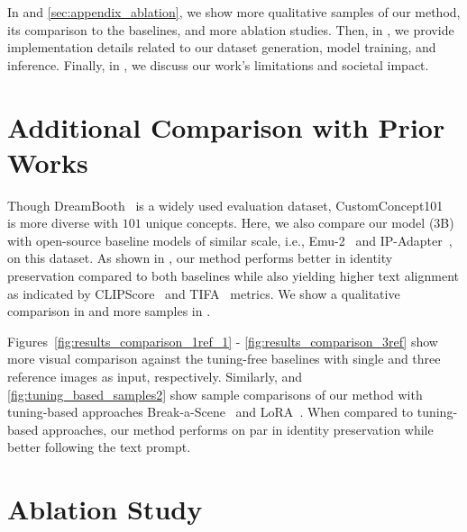 \renewcommand{\thefootnote}{\arabic{footnote}}
\clearpage
{}
\vspace{5pt}


In  and \ref{sec:appendix_ablation}, we show more qualitative samples of our method, its comparison to the baselines, and more ablation studies. Then, in , we provide implementation details related to our dataset generation, model training, and inference. Finally, in , we discuss our work's limitations and societal impact. 




\section{Additional Comparison with Prior Works} 


Though DreamBooth~\cite{ruiz2022dreambooth} is a widely used evaluation dataset, CustomConcept101~\cite{kumari2023multi} is more diverse with $101$ unique concepts. Here, we also compare our model (3B) with open-source baseline models of similar scale, i.e., Emu-2~\cite{Emu2} and IP-Adapter~\cite{ye2023ip}, on this dataset. As shown in , our method performs better in identity preservation compared to both baselines while also yielding higher text alignment as indicated by CLIPScore~\cite{radford2021learning} and TIFA~\cite{hu2023tifa} metrics. We show a qualitative comparison in  and more samples in . 

Figures~\ref{fig:results_comparison_1ref_1} - \ref{fig:results_comparison_3ref} show more visual comparison against the tuning-free baselines with single and three reference images as input, respectively. Similarly,  and \ref{fig:tuning_based_samples2} show sample comparisons of our method with tuning-based approaches Break-a-Scene~\cite{avrahami2023break} and LoRA~\cite{hu2021lora,loraimplementation}. When compared to tuning-based approaches, our method performs on par in identity preservation while better following the text prompt. 









\section{Ablation Study}

